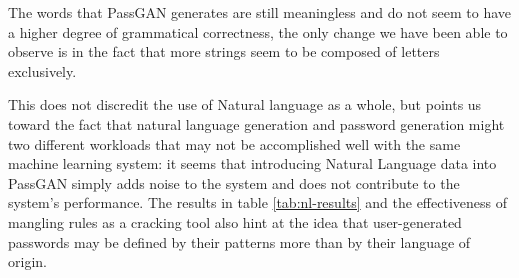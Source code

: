 The words that PassGAN generates are still meaningless and do not seem to have a higher degree of grammatical correctness, the only change we have been able to observe is in the fact that more strings seem to be composed of letters exclusively.

This does not discredit the use of Natural language as a whole, but points us toward the fact that natural language generation and password generation might two different workloads that may not be accomplished well with the same machine learning system: it seems that introducing Natural Language data into PassGAN simply adds noise to the system and does not contribute to the system's performance.
The results in table \ref{tab:nl-results} and the effectiveness of mangling rules as a cracking tool also hint at the idea that user-generated passwords may be defined by their patterns more than by their language of origin.

